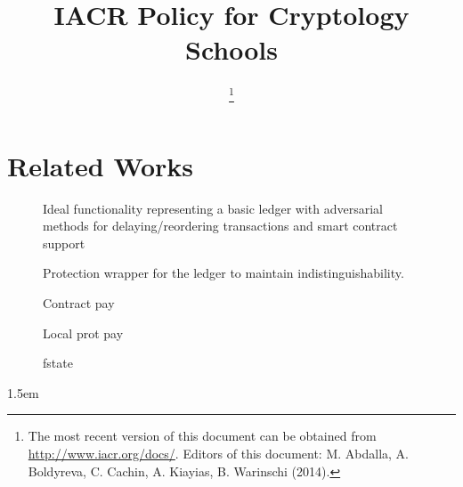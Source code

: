 \documentclass[11pt]{article}
\title{\bf IACR Policy for Cryptology Schools}
\author{\mbox{}}
\date{\lastupdate
 \footnote{The most recent version of this document
    can be obtained from \protect\url{http://www.iacr.org/docs/}.\newline
  Editors of this document: M. Abdalla, A. Boldyreva, C. Cachin, A. Kiayias, B. Warinschi (2014).}}
\begin{document}
\pagestyle{fancy}

\maketitle

\section{Related Works}


\begin{figure}[!ht]
	
	\label{fig:functionality:exectx}
\end{figure}

\begin{figure}[!ht]

\label{fig:functionality:execcreate}
\end{figure}

\begin{figure}[!ht]

	\caption{Ideal functionality representing a basic ledger with adversarial methods for delaying/reordering transactions and smart contract support}
	\label{fig:functionality:ledger}
\end{figure}

\begin{figure}
	
	\caption{Protection wrapper for the ledger to maintain indistinguishability.}
\end{figure}

%	

\begin{figure}
	
	\caption{Contract pay}
\end{figure}

\begin{figure}
	
	\caption{Local prot pay}
\end{figure}

\begin{figure}
	
	\caption{fstate}
\end{figure}



\emergencystretch 1.5em

\end{document}
